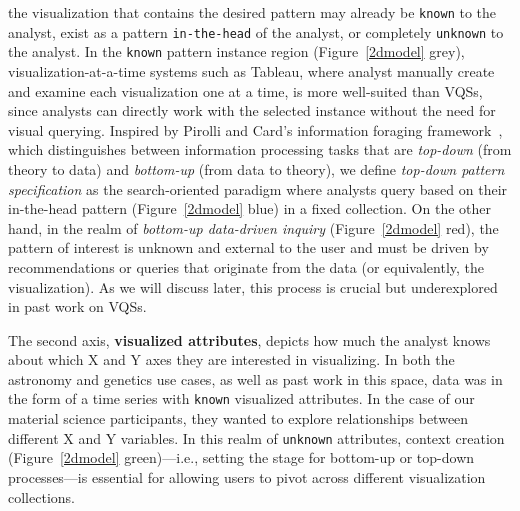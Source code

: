 the visualization that contains 
the desired pattern may already be \texttt{known} to the analyst, 
exist as a pattern \texttt{in-the-head} of the analyst, 
or completely \texttt{unknown} to the analyst. 
In the \texttt{known} pattern instance region (Figure~\ref{2dmodel} grey), visualization-at-a-time systems such as Tableau, 
where analyst manually create and examine each visualization one at a time, 
is more well-suited than VQSs, since analysts can directly work with the selected instance without the need for visual querying. 
Inspired by Pirolli and Card's information 
foraging framework~\cite{Pirolli}, which distinguishes 
between information processing tasks that are \textit{top-down} 
(from theory to data) and \textit{bottom-up} (from data to theory), 
we define \textit{top-down pattern specification} as the search-oriented paradigm where analysts query based on their 
in-the-head pattern (Figure~\ref{2dmodel} blue) in a fixed collection. 
On the other hand, in the realm of \textit{bottom-up 
data-driven inquiry} (Figure~\ref{2dmodel} red), 
the pattern of interest is unknown and external 
to the user and must be driven by recommendations 
or queries that originate from the data (or equivalently, the visualization). 
As we will discuss later, this process is crucial 
but underexplored in past work on VQSs.
\par The second axis, \textbf{visualized attributes}, 
depicts how much the analyst 
knows about which X and Y axes 
they are interested in visualizing. 
In both the astronomy and genetics use cases, 
as well as past work in this space, 
data was in the form of a time series 
with \texttt{known} visualized attributes. 
In the case of our material science participants, 
they wanted to explore relationships between different 
X and Y variables. 
In this realm of \texttt{unknown} attributes, 
context creation (Figure~\ref{2dmodel} green)---i.e.,
setting the stage for bottom-up or top-down processes---is 
essential for allowing users 
to pivot across different visualization collections.%
